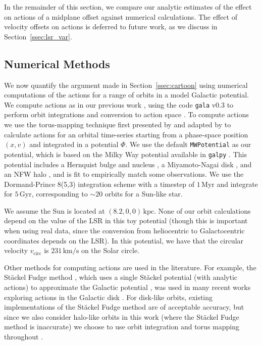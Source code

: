 \documentclass[twocolumn]{aastex62}
\newcommand{\kpc}{\text{kpc}}
\newcommand{\Myr}{\text{Myr}}
\newcommand{\Gyr}{\text{Gyr}}
\newcommand{\kms}{\text{km}/\text{s}}
\begin{document}
In the remainder of this section, we compare our analytic estimates of the effect on actions of a midplane offset against numerical calculations. The effect of velocity offsets on actions is deferred to future work, as we discuss in Section~\ref{ssec:lsr_var}.

\subsection{Numerical Methods} \label{ssec:action_comp}
We now quantify the argument made in Section~\ref{ssec:cartoon} using numerical computations of the actions for a range of orbits in a model Galactic potential.
We compute actions as in our previous work \citep{2018ApJ...867...31B}, using
the code \texttt{gala} v0.3 to perform orbit integrations and conversion to
action space \citep{2017JOSS....2..388P,Price-Whelan:2018}. To compute actions
we use the torus-mapping technique first presented by
\citet{1990MNRAS.244..634M} and adapted by \citet{2014MNRAS.441.3284S} to
calculate actions for an orbital time-series starting from a phase-space
position $(x, v)$ and integrated in a potential $\Phi$. We use the default
\texttt{MWPotential} as our potential, which is based on the Milky Way
potential available in \texttt{galpy} \citep{2015ApJS..216...29B}. This
potential includes a Hernquist bulge and nucleus \citep{1990ApJ...356..359H},
a Miyamoto-Nagai disk \citep{1975PASJ...27..533M}, and an NFW halo
\citep{1997ApJ...490..493N}, and is fit to empirically match some
observations. We use the Dormand-Prince 8(5,3) integration scheme
\citep{Dormand80:integrator} with a timestep of $1\,\Myr$ and integrate for
$5\,\Gyr$, corresponding to $\sim 20$ orbits for a Sun-like star.

We assume the Sun is located at $(8.2, 0, 0)\,\kpc$. None of our orbit
calculations depend on the value of the LSR in this toy potential (though this
is important when using real data, since the conversion from heliocentric to
Galactocentric coordinates depends on the LSR). In this potential, we have
that the circular velocity $v_{\text{circ}}$ is $231\,\kms$ on the Solar
circle.

Other methods for computing actions are used in the literature. For example,
the St\"ackel Fudge method \citep{2016MNRAS.457.2107S}, which uses a single
St\"ackel potential (with analytic actions) to approximate the Galactic
potential \citep{1985MNRAS.216..273D,2012MNRAS.426.1324B}, was used in many
recent works exploring actions in the Galactic disk
\citep[e.g.][]{2019MNRAS.484.3291T,2018MNRAS.481.4093S,2018arXiv180803278T}.
For disk-like orbits, existing implementations of the St\"ackel Fudge method
are of acceptable accuracy, but since we also consider halo-like orbits in
this work (where the St\"ackel Fudge method is inaccurate) we choose to use
orbit integration and torus mapping throughout \citep{2016MNRAS.457.2107S}.
\end{document}
